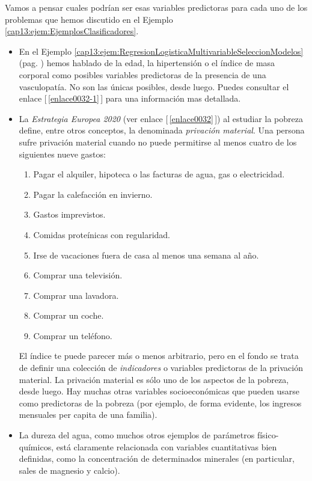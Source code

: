 \begin{ejemplo}
\label{cap13:ejem:ClasificadorSpam}
Vamos a pensar cuales podrían ser esas variables predictoras para cada uno de los problemas que hemos discutido en el Ejemplo \ref{cap13:ejem:EjemplosClasificadores}.
\begin{itemize}
\item 	En el Ejemplo \ref{cap13:ejem:RegresionLogisticaMultivariableSeleccionModelos}
(pag. \pageref{cap13:ejem:RegresionLogisticaMultivariableSeleccionModelos}) hemos hablado de la edad, la hipertensión o el índice de masa corporal como posibles variables predictoras de la presencia de una vasculopatía. No son las únicas posibles, desde luego. Puedes consultar el  enlace [\,\ref{enlace0032-1}\,]\label{enlace0032a-1} para una información mas detallada.

\item La {\em Estrategia Europea 2020} (ver enlace [\,\ref{enlace0032}\,]\label{enlace0032a}) al estudiar la pobreza define, entre otros conceptos, la denominada {\em privación material}. Una persona sufre privación material cuando no puede permitirse al menos cuatro de los siguientes nueve gastos:
\begin{enumerate}
	\item Pagar el alquiler, hipoteca o las facturas de agua, gas o electricidad.
	\item Pagar la calefacción en invierno.
	\item Gastos imprevistos.
	\item Comidas proteínicas con regularidad.
	\item Irse de vacaciones fuera de casa al menos una semana al año.
	\item Comprar una televisión.
	\item Comprar una lavadora.
	\item Comprar un coche.
	\item Comprar un teléfono.
\end{enumerate}
El índice te puede parecer más o menos arbitrario, pero en el fondo se trata de definir una colección de {\em indicadores} o variables predictoras de la privación material. La privación material es sólo uno de los aspectos de la pobreza, desde luego. Hay muchas  otras variables socioeconómicas que pueden usarse como predictoras de la pobreza (por ejemplo, de forma evidente, los ingresos mensuales per capita de una familia).

\item La dureza del agua, como muchos otros ejemplos de parámetros físico-químicos, está claramente relacionada con variables cuantitativas bien definidas, como la concentración de determinados minerales (en particular, sales de magnesio y calcio).


\end{itemize}
\end{ejemplo}
